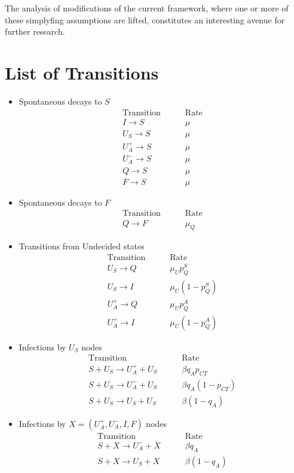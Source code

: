 \documentclass[aps,twocolumn,superscriptaddress,nofootinbib,pre,floatfix]{revtex4-1}
\begin{document}
The analysis of modifications of the current framework, where one or
more of these simplyfing assumptions are lifted,
constitutes an interesting avenue for further research.

\section{List of Transitions}
\label{Model}
\begin{itemize}
\item
  Spontaneous decays to $S$
  \begin{eqnarray} \nonumber
   \textrm{Transition} & ~~~~~~ & \textrm{Rate} \\ \nonumber
  I \to S & & \mu\\ \nonumber
  U_S \to S & &\mu\\ \nonumber
  U_A^+ \to S & &\mu\\ \nonumber
  U_A^- \to S & &\mu\\ \nonumber
  Q \to S & &\mu\\ \nonumber
  F \to S & &\mu 
\end{eqnarray}

\item
  Spontaneous decays to $F$
  \begin{eqnarray} \nonumber
    \textrm{Transition} & ~~~~~~ & \textrm{Rate} \\ \nonumber
    Q \to F & &\mu_Q
\end{eqnarray}

\item
  Transitions from Undecided states
  \begin{eqnarray} \nonumber
    \textrm{Transition} & ~~~~~~ & \textrm{Rate} \\ \nonumber
    U_S \to Q & &\mu_U p_Q^S \\ \nonumber
    U_S \to I & &\mu_U (1-p_Q^S) \\ \nonumber
    U_A^+ \to Q & &\mu_U p_Q^A \\ \nonumber
    U_A^+ \to I & &\mu_U (1-p_Q^A)
\end{eqnarray}

\item
  Infections by $U_S$ nodes
  \begin{eqnarray} \nonumber
    \textrm{Transition} & ~~~~~~ & \textrm{Rate} \\ \nonumber
    S+U_S \to U_A^++U_S & &\beta q_A p_{CT} \\ \nonumber
    S+U_S \to U_A^-+U_S & &\beta q_A (1-p_{CT}) \\ \nonumber
    S+U_S \to U_S + U_S & &\beta (1-q_A)
\end{eqnarray}

  
\item
  Infections by $X=(U_A^+,U_A^-,I,F)$ nodes
  \begin{eqnarray} \nonumber
    \textrm{Transition} & ~~~~~~ & \textrm{Rate} \\ \nonumber
    S+X \to U_A^-+X & &\beta q_A \\ \nonumber
    S+X \to U_S+X & &\beta (1-q_A)
\end{eqnarray}

  
\end{itemize}
  
\end{document}
